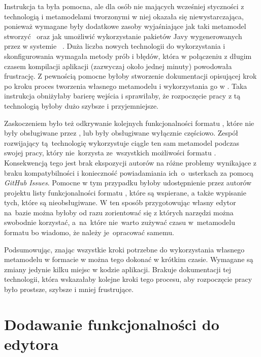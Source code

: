 Instrukcja ta była pomocna, ale dla osób nie mających wcześniej styczności z
technologią \EMF{} i metamodelami tworzonymi w niej okazała się
niewystarczająca, ponieważ wymagane były dodatkowe zasoby wyjaśniające jak taki
metamodel stworzyć~\cite{dokumentacja-sirius-desktop,dokumentacja-aql} oraz jak
umożliwić wykorzystanie pakietów Javy wygenerowanych przez \EMF{} w systemie
\Maven{}~\cite{maven-tycho-tutorial}.
Duża liczba nowych technologii do wykorzystania i skonfigurowania wymagała
metody prób i błędów, która w połączeniu z długim czasem kompilacji aplikacji
(zazwyczaj około jednej minuty) powodowała frustrację. Z pewnością pomocne
byłoby
stworzenie dokumentacji opisującej krok po kroku proces tworzenia własnego
metamodelu i wykorzystania go w \SiriusWeb{}. Taka instrukcja obniżyłaby
barierę wejścia i sprawiłaby, że rozpoczęcie pracy z tą technologią byłoby dużo
szybsze i przyjemniejsze.

Zaskoczeniem było też odkrywanie kolejnych funkcjonalności formatu
\Ecore{}, które nie były obsługiwane przez \SiriusWeb{}, lub były
obsługiwane wyłącznie częściowo. Zespół rozwijający tą~technologię wykorzystuje
ciągle ten sam metamodel podczas swojej pracy, który nie~korzysta ze~wszystkich
możliwości formatu \Ecore{}. Konsekwencją tego jest brak ekspozycji autorów
\SiriusWeb{} na różne problemy wynikające z braku kompatybilności i
konieczność powiadamiania ich~o~usterkach za pomocą \emph{GitHub Issues}.
Pomocne w tym przypadku byłoby udostępnienie przez autorów projektu listy
funkcjonalności formatu \Ecore{}, które są wspierane, a także wypisanie
tych, które są nieobsługiwane. W ten sposób przygotowując własny edytor
na~bazie
\SiriusWeb{} można byłoby od razu zorientować się z których narzędzi można
swobodnie korzystać, a~na~które nie~warto zużywać czasu w~metamodelu formatu
\Ecore{} bo wiadomo, że należy je~opracować samemu.

Podsumowując, znając wszystkie kroki potrzebne do wykorzystania własnego
metamodelu w formacie \Ecore{} w \SiriusWeb{} można tego dokonać w krótkim
czasie.
Wymagane są zmiany jedynie kilku miejsc w kodzie aplikacji. Brakuje
dokumentacji tej technologii, która wskazałaby kolejne kroki tego
procesu, aby rozpoczęcie pracy było prostsze, szybsze i mniej frustrujące.

\section{Dodawanie funkcjonalności do edytora}

